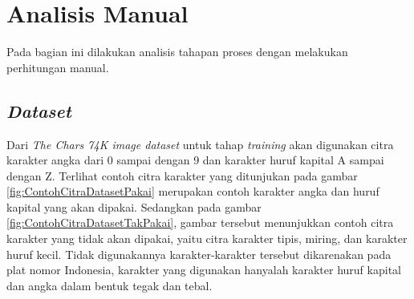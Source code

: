 
\section{Analisis Manual}
\noindent Pada bagian ini dilakukan analisis tahapan proses dengan melakukan perhitungan manual.\\

\subsection{\textit{Dataset}}
\noindent Dari \textit{The Chars 74K image dataset} untuk tahap \textit{training} akan digunakan citra karakter angka dari 0 sampai dengan 9 dan karakter huruf kapital A sampai dengan Z. Terlihat contoh citra karakter yang ditunjukan pada gambar \ref{fig:ContohCitraDatasetPakai} merupakan contoh karakter angka dan huruf kapital yang akan dipakai. Sedangkan pada gambar \ref{fig:ContohCitraDatasetTakPakai}, gambar tersebut menunjukkan contoh citra karakter yang tidak akan dipakai, yaitu citra karakter tipis, miring, dan karakter huruf kecil. Tidak digunakannya karakter-karakter tersebut dikarenakan pada plat nomor Indonesia, karakter yang digunakan hanyalah karakter huruf kapital dan angka dalam bentuk tegak dan tebal.

